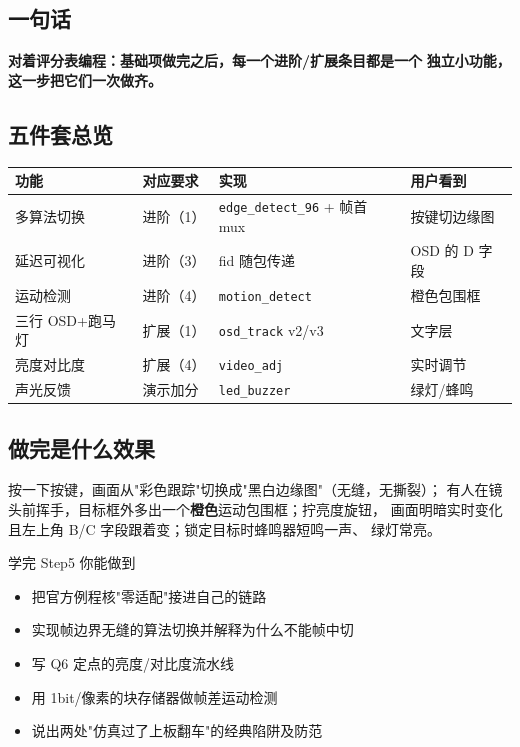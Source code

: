 \documentclass[11pt]{ctexart}
\newcommand{\code}[1]{\texttt{#1}}
\begin{document}
\subsection{一句话}

\textbf{对着评分表编程：基础项做完之后，每一个进阶/扩展条目都是一个}
\textbf{独立小功能，这一步把它们一次做齐。}

\subsection{五件套总览}

\begin{center}
\begin{tabular}{llll}
\toprule
\rowcolor{rowtint}\textbf{功能} & \textbf{对应要求} & \textbf{实现} & \textbf{用户看到} \\
\midrule
多算法切换 & 进阶（1） & \code{edge\_detect\_96} + 帧首 mux & 按键切边缘图 \\
延迟可视化 & 进阶（3） & fid 随包传递 & OSD 的 D 字段 \\
运动检测 & 进阶（4） & \code{motion\_detect} & 橙色包围框 \\
三行 OSD+跑马灯 & 扩展（1） & \code{osd\_track} v2/v3 & 文字层 \\
亮度对比度 & 扩展（4） & \code{video\_adj} & 实时调节 \\
声光反馈 & 演示加分 & \code{led\_buzzer} & 绿灯/蜂鸣 \\
\bottomrule
\end{tabular}
\end{center}

\subsection{做完是什么效果}

按一下按键，画面从"彩色跟踪"切换成"黑白边缘图"（无缝，无撕裂）；
有人在镜头前挥手，目标框外多出一个\textbf{橙色}运动包围框；拧亮度旋钮，
画面明暗实时变化且左上角 B/C 字段跟着变；锁定目标时蜂鸣器短鸣一声、
绿灯常亮。

\begin{okbox}{学完 Step5 你能做到}
\begin{itemize}
  \item 把官方例程核"零适配"接进自己的链路
  \item 实现帧边界无缝的算法切换并解释为什么不能帧中切
  \item 写 Q6 定点的亮度/对比度流水线
  \item 用 1bit/像素的块存储器做帧差运动检测
  \item 说出两处"仿真过了上板翻车"的经典陷阱及防范
\end{itemize}
\end{okbox}
\end{document}
